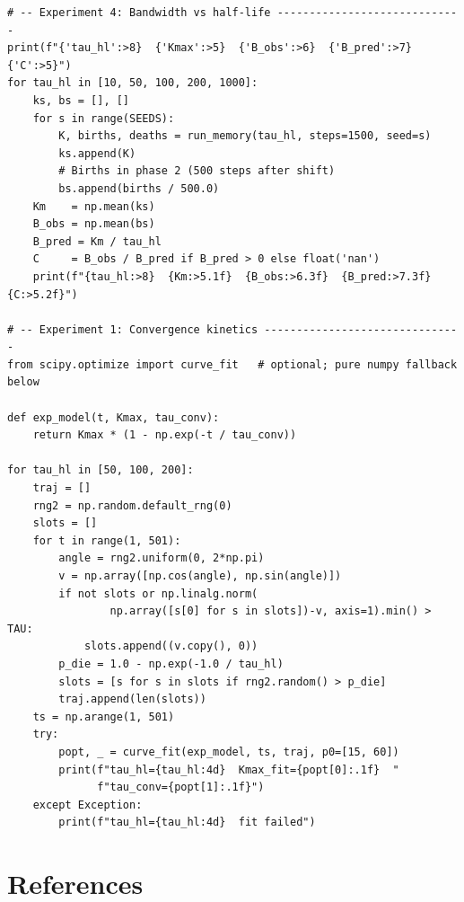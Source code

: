 \documentclass[11pt]{article}
\begin{document}
\begin{lstlisting}[caption={paper2\_bandwidth\_repro.py}]
# -- Experiment 4: Bandwidth vs half-life -----------------------------
print(f"{'tau_hl':>8}  {'Kmax':>5}  {'B_obs':>6}  {'B_pred':>7}  {'C':>5}")
for tau_hl in [10, 50, 100, 200, 1000]:
    ks, bs = [], []
    for s in range(SEEDS):
        K, births, deaths = run_memory(tau_hl, steps=1500, seed=s)
        ks.append(K)
        # Births in phase 2 (500 steps after shift)
        bs.append(births / 500.0)
    Km    = np.mean(ks)
    B_obs = np.mean(bs)
    B_pred = Km / tau_hl
    C     = B_obs / B_pred if B_pred > 0 else float('nan')
    print(f"{tau_hl:>8}  {Km:>5.1f}  {B_obs:>6.3f}  {B_pred:>7.3f}  {C:>5.2f}")

# -- Experiment 1: Convergence kinetics -------------------------------
from scipy.optimize import curve_fit   # optional; pure numpy fallback below

def exp_model(t, Kmax, tau_conv):
    return Kmax * (1 - np.exp(-t / tau_conv))

for tau_hl in [50, 100, 200]:
    traj = []
    rng2 = np.random.default_rng(0)
    slots = []
    for t in range(1, 501):
        angle = rng2.uniform(0, 2*np.pi)
        v = np.array([np.cos(angle), np.sin(angle)])
        if not slots or np.linalg.norm(
                np.array([s[0] for s in slots])-v, axis=1).min() > TAU:
            slots.append((v.copy(), 0))
        p_die = 1.0 - np.exp(-1.0 / tau_hl)
        slots = [s for s in slots if rng2.random() > p_die]
        traj.append(len(slots))
    ts = np.arange(1, 501)
    try:
        popt, _ = curve_fit(exp_model, ts, traj, p0=[15, 60])
        print(f"tau_hl={tau_hl:4d}  Kmax_fit={popt[0]:.1f}  "
              f"tau_conv={popt[1]:.1f}")
    except Exception:
        print(f"tau_hl={tau_hl:4d}  fit failed")
\end{lstlisting}

\section*{References}
\end{document}
